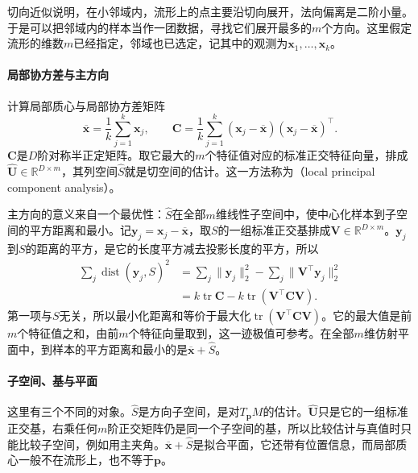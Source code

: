 切向近似说明，在小邻域内，流形上的点主要沿切向展开，法向偏离是二阶小量。于是可以把邻域内的样本当作一团数据，寻找它们展开最多的$m$个方向。这里假定流形的维数$m$已经指定，邻域也已选定，记其中的观测为$\bm x_1,\ldots,\bm x_k$。

\paragraph{局部协方差与主方向}

计算局部质心与局部协方差矩阵
\begin{equation}
 \overline{\bm x}=\frac1k\sum_{j=1}^k\bm x_j,\qquad
 \bm C=\frac1k\sum_{j=1}^k(\bm x_j-\overline{\bm x})(\bm x_j-\overline{\bm x})^\top .
 \label{eq:mrec-local-covariance}
\end{equation}
$\bm C$是$D$阶对称半正定矩阵。取它最大的$m$个特征值对应的标准正交特征向量，排成$\widehat{\bm U}\in\mathbb R^{D\times m}$，其列空间$\widehat S$就是切空间的估计。这一方法称为（local principal component analysis）。

主方向的意义来自一个最优性：$\widehat S$在全部$m$维线性子空间中，使中心化样本到子空间的平方距离和最小。记$\bm y_j=\bm x_j-\overline{\bm x}$，取$S$的一组标准正交基排成$\bm V\in\mathbb R^{D\times m}$。$\bm y_j$到$S$的距离的平方，是它的长度平方减去投影长度的平方，所以
\[
 \begin{aligned}
 \sum_j\operatorname{dist}(\bm y_j,S)^2
 &=\sum_j\lVert\bm y_j\rVert_2^2-\sum_j\lVert\bm V^\top\bm y_j\rVert_2^2\\
 &=k\operatorname{tr}\bm C-k\operatorname{tr}(\bm V^\top\bm C\bm V).
 \end{aligned}
\]
第一项与$S$无关，所以最小化距离和等价于最大化$\operatorname{tr}(\bm V^\top\bm C\bm V)$。它的最大值是前$m$个特征值之和，由前$m$个特征向量取到，这一迹极值可参考。在全部$m$维仿射平面中，到样本的平方距离和最小的是$\overline{\bm x}+\widehat S$。

\paragraph{子空间、基与平面}

这里有三个不同的对象。$\widehat S$是方向子空间，是对$T_{\bm p}M$的估计。$\widehat{\bm U}$只是它的一组标准正交基，右乘任何$m$阶正交矩阵仍是同一个子空间的基，所以比较估计与真值时只能比较子空间，例如用主夹角。$\overline{\bm x}+\widehat S$是拟合平面，它还带有位置信息，而局部质心一般不在流形上，也不等于$\bm p$。

